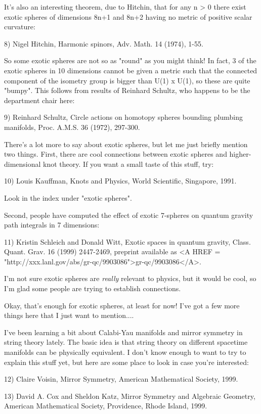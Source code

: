 It's also an interesting theorem, due to Hitchin, that for any n > 0
there exist exotic spheres of dimensions 8n+1 and 8n+2 having no metric
of positive scalar curvature:

8) Nigel Hitchin, Harmonic spinors, Adv. Math. 14 (1974), 1-55.
 
So some exotic spheres are not so as "round" as you might think!   
In fact, 3 of the exotic spheres in 10 dimensions cannot be given a 
metric such that the connected component of the isometry group is 
bigger than U(1) x U(1), so these are quite "bumpy".  This follows 
from results of Reinhard Schultz, who happens to be the department 
chair here:

9) Reinhard Schultz, Circle actions on homotopy spheres bounding
plumbing manifolds, Proc. A.M.S. 36 (1972), 297-300.

There's a lot more to say about exotic spheres, but let me just
briefly mention two things.  First, there are cool connections 
between exotic spheres and higher-dimensional knot theory.  If 
you want a small taste of this stuff, try:

10) Louis Kauffman, Knots and Physics, World Scientific, Singapore,
1991.

Look in the index under "exotic spheres".   

Second, people have computed the effect of exotic 7-spheres on 
quantum gravity path integrals in 7 dimensions:

11) Kristin Schleich and Donald Witt, Exotic spaces in quantum 
gravity, Class. Quant. Grav. 16 (1999) 2447-2469, preprint available 
as <A HREF = "http://xxx.lanl.gov/abs/gr-qc/9903086">gr-qc/9903086</A>.

I'm not sure exotic spheres are \emph{really} relevant to physics, but
it would be cool, so I'm glad some people are trying to establish
connections.

Okay, that's enough for exotic spheres, at least for now!  I've got 
a few more things here that I just want to mention....

I've been learning a bit about Calabi-Yau manifolds and mirror
symmetry in string theory lately.  The basic idea is that string
theory on different spacetime manifolds can be physically equivalent.
I don't know enough to want to try to explain this stuff yet, but here 
are some place to look in case you're interested:

12) Claire Voisin, Mirror Symmetry, American Mathematical Society, 1999.

13) David A. Cox and Sheldon Katz, Mirror Symmetry and Algebraic Geometry,
American Mathematical Society, Providence, Rhode Island, 1999.

